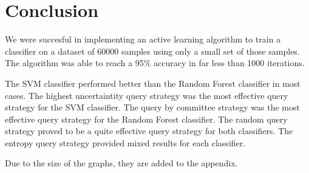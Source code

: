 
\section{Conclusion}

We were succesful in implementing an active learning algorithm to train a classifier on a dataset of 60000 samples using only a small set of those samples. 
The algorithm was able to reach a 95\% accuracy in far less than 1000 iterations.\par
The SVM classifier performed better than the Random Forest classifier in most cases. 
The highest uncertaintity query strategy was the most effective query strategy for the SVM classifier. 
The query by committee strategy was the most effective query strategy for the Random Forest classifier. The random query strategy proved to be a quite effective query strategy for both classifiers. 
The entropy query strategy provided mixed results for each classifier.\par
Due to the size of the graphs, they are added to the appendix.